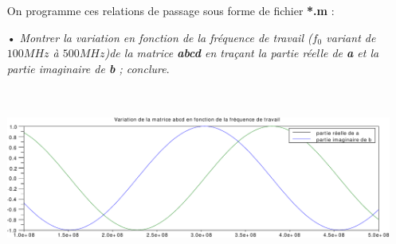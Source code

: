 \documentclass[11pt;a4paper;fleqn]{report}
\begin{document}
\begin{itemize}
     On programme ces relations de passage sous forme de fichier \textbf{*.m} :
     


    \item[•] \textit{Montrer la variation en fonction de la fréquence de travail (\textbf{$f_0$} variant de $100MHz$ à $500MHz$)de la matrice \textbf{abcd} en traçant la partie réelle de \textbf{a} et la partie imaginaire de \textbf{b} ; conclure}.
     

     \includegraphics[width=\linewidth,height=6cm]{images/1a}

   \end{itemize}
\end{document}
